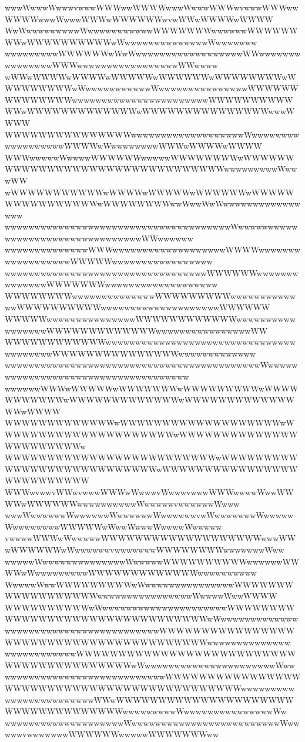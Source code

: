 \documentclass[a4paper]{article}
\begin{document}
\begin{procgrass}{\NabeAzz}
wwwWwwwWwwwvwwwWWWwwWWWWwwwWwwwWWWwvwwwWWWwwWWWWwwwWwwwWWWwWWWWWWwvwWWwWWWWwWWWW
WwWwwwwwwwwwWwwwwwwwwwwwWWWWWWWwwwwwwWWWWWWWWwWWWWWWWWWWwWwwwwwwwwwwwwwwWwwwwwww
wwwwwwwwwWWWWWWwWwWwwwwwwwwwwwwwwwwwwWWwwwwwwwwwwwwwwwWWWwwwwwwwwwwwwwwwwwWWwwww
wWWwWWWWwWWWWwWWWWWwWWWWWWwWWWWWWWWwWWWWWWWWWwWwwwwwwwwwwwWwwwwwwwwwwwwwwwWWWWWW
WWWWWWWWwwwwwwwwwwwwwwwwwwwwwwwWWWWWWWWWWWWwWWWWWWWWWWWWWwWWWWWWWWWWWWWWWwwwWWWW
WWWWWWWWWWWWWWWwwwwwwwwwwwwwwwwwwwWwwwwwwwwwwwwwwwwwwWWWWwWwwwwwwwwWWWwWWWWwWWWW
WWWwwwwwWwwwwWWWWWWwwwwwWWWWWWWWwWWWWWWWWWWWWWWWWWWWWWWWWWWWWWWWWwwwwwwwwwWwwwWW
wWWWWWWWWWWWwWWWWwWWWWWwWWWWWWwWWWWWWWWWWWWWWWWwWWWWWWWWwwWwwWwWwwwwwwwwwwwwwwww
wwwwwwwwwwwwwwwwwwwwwwwwwwwwwwwwwwwwwwWwwwwwwwwwwwwwwwwwwwwwwwwwwwwwwwwwWWwwwwww
wwwwwwwwwwwwwwWWWwwwwwwwwwwwwwwwwwwwWWWWwwwwwwwwwwwwwwwwwwWWWWWwwwwwwwwwwwwwwwww
wwwwwwwwwwwwwwwwwwwwwwwwwwwwwwwwwwWWWWWWwwwwwwwwwwwwwwWWWWWWWwwwwwwwwwwwwwwwwwww
WWWWWWWWwwwwwwwwwwwwwwWWWWWWWWWwwwwwwwwwwwwwWWWWWWWWWWwwwwwwwwwwwwwwwwwwwwWWWWWW
WWWWWwwwwwwwwwwwwwwwWWWWWWWWWWWWwwwwwwwwwwwwwwwwwWWWWWWWWWWWWWwwwwwwwwwwwwwwwwWW
WWWWWWWWWWWWwwwwwwwwwwwwwwwwwwwwwwwwwwwwwwwwwwwwwwwwWWWWWWWWWWWWWWWwwwwwwwwwwwww
wwwwwwwwwwwwwwwwwwwwwwwwwwwwwwwwwwwwwwwwwwwWwwwwwwwwwwwwwwwwwwwwwwwwwwwwwwwwwwww
wwwwwwWWWwWWWWWwWWWWWWWwWWWWWWWWWwWWWWWWWWWWWwWWWWWWWWWWWWWwWWWWWWWWWWWWWWWwWWWW
WWWWWWWWWWWWWwWWWWWWWWWWWWWWWWWWWwWWWWWWWWWWWWWWWWWWWWWwWWWWWWWWWWWWWWWWWWWWWWWw
WWWWWWWWWWWWWWWWWWWWWWWWWwWWWWWWWWWWWWWWWWWWWWWWWWWWWwWWWWWWWWWWWWWWWWWWWWWWWWWW
WWWwvwwvWWwvwwwWWWwWwwwvWwwwvwwwWWWwwwwWwwWWWWwWWWWWWwwwwwwwwwwWwwwwwvwwwwwwWwww
wwwWwwwwwwWwwwwwwWwwwwwwWwwwwwwvwWwwwwwwwWwwwwwWwwwwwwwwWWWWWwWwwWwwwWwwwwWwwwww
vwwwwWWWwWwwwwwWWWWWWWWWWWWWWWWWWWwwwWWwWWWWWWwWwwwwwwvwwwwwwwWWWWWWWWwwwwwwwWww
wwwwwWwwwwwwwwwwwwwwWwwwwwWWWWWWWWWWwwwwwwWWWWwWwwwwwwwwwWWWWWWWWWWWWWwwwwwwwwww
WwwwwWwwWWWWWWWWWwWwwwwwwwwwwwwwwwWWWWWWWWWWWWWWWWWWwwwwwwwwwwwwwwwwWwwwwWwwWWWW
WWWWWWWWWWwWwwwwwwwwwwwwwwwwwwwwwWWWWWWWWWWWWWWWWWWWWWWWWWWWWWWWWwWwwwwwwwwwwwww
wwwwwwwwwwwwwwwwwwwwwwwwwwWWWWWWWWWWWWWWWWWWWWWWWWWWWWWWWWWWWWWWWWwwwwwwwwwwwwww
wwwwwwwwwwwwWWWWWWWWWWWWWWWWWWWWWWWWWWWWWWWWWWWWWWWWWwWwwwwwwwwwwwwwwwwwwwwwwWww
wwwwwwwwwwwwwwwwwwwwwwwwwwwWWWWWWWWWWWWWWWWWWWWWWWWWWWWWWWWWWWWWWWWWWWWwwwwwwwww
wwwwwwwwwwwwwwwWWwWWWWWWWWWWWWWWWWWWWWWWWWWWWWWWWWWWWwwwwwwwwwWwwwwwwwwwwwwwwwWw
wwwwwwwwwwwwwwwwwwwwWwwwwwwwwwwwwwwwwwwwwwwwwwWwwwwwvwwwwwwwWWWWWWwwwwwWWWWWWWww

\end{procgrass}
\end{document}
